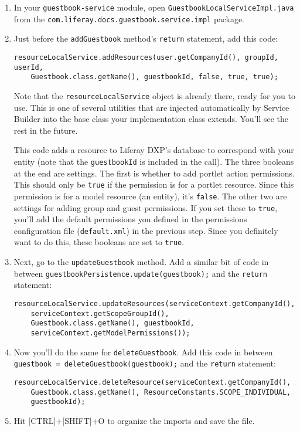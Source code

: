 \begin{enumerate}
\def\labelenumi{\arabic{enumi}.}
\item
  In your \texttt{guestbook-service} module, open
  \texttt{GuestbookLocalServiceImpl.java} from the
  \texttt{com.liferay.docs.guestbook.service.impl} package.
\item
  Just before the \texttt{addGuestbook} method's \texttt{return}
  statement, add this code:

\begin{verbatim}
resourceLocalService.addResources(user.getCompanyId(), groupId, userId,
    Guestbook.class.getName(), guestbookId, false, true, true);
\end{verbatim}

  Note that the \texttt{resourceLocalService} object is already there,
  ready for you to use. This is one of several utilities that are
  injected automatically by Service Builder into the base class your
  implementation class extends. You'll see the rest in the future.

  This code adds a resource to Liferay DXP's database to correspond with
  your entity (note that the \texttt{guestbookId} is included in the
  call). The three booleans at the end are settings. The first is
  whether to add portlet action permissions. This should only be
  \texttt{true} if the permission is for a portlet resource. Since this
  permission is for a model resource (an entity), it's \texttt{false}.
  The other two are settings for adding group and guest permissions. If
  you set these to \texttt{true}, you'll add the default permissions you
  defined in the permissions configuration file (\texttt{default.xml})
  in the previous step. Since you definitely want to do this, these
  booleans are set to \texttt{true}.
\item
  Next, go to the \texttt{updateGuestbook} method. Add a similar bit of
  code in between \texttt{guestbookPersistence.update(guestbook);} and
  the \texttt{return} statement:

\begin{verbatim}
resourceLocalService.updateResources(serviceContext.getCompanyId(),
    serviceContext.getScopeGroupId(), 
    Guestbook.class.getName(), guestbookId,
    serviceContext.getModelPermissions());
\end{verbatim}
\item
  Now you'll do the same for \texttt{deleteGuestbook}. Add this code in
  between \texttt{guestbook\ =\ deleteGuestbook(guestbook);} and the
  \texttt{return} statement:

\begin{verbatim}
resourceLocalService.deleteResource(serviceContext.getCompanyId(),
    Guestbook.class.getName(), ResourceConstants.SCOPE_INDIVIDUAL,
    guestbookId);
\end{verbatim}
\item
  Hit {[}CTRL{]}+{[}SHIFT{]}+O to organize the imports and save the
  file.
\end{enumerate}

